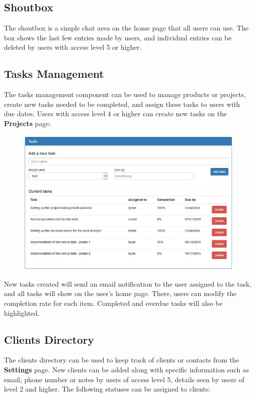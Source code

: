 \documentclass[11pt]{article}
\begin{document}
\subsection{Shoutbox}
The shoutbox is a simple chat area on the home page that all users can use. The box shows the last few entries made by users, and individual entries can be deleted by users with access level 5 or higher.

\subsection{Tasks Management}
The tasks management component can be used to manage products or projects, create new tasks needed to be completed, and assign these tasks to users with due dates. Users with access level 4 or higher can create new tasks on the \textbf{Projects} page:

\begin{figure}[h]
\includegraphics{projectmanagement.jpg}
\end{figure}

New tasks created will send an email notification to the user assigned to the task, and all tasks will show on the user's home page. There, users can modify the completion rate for each item. Completed and overdue tasks will also be highlighted.

\subsection{Clients Directory}
The clients directory can be used to keep track of clients or contacts from the \textbf{Settings} page. New clients can be added along with specific information such as email, phone number or notes by users of access level 5, details seen by users of level 2 and higher. The following statuses can be assigned to clients:
\end{document}
